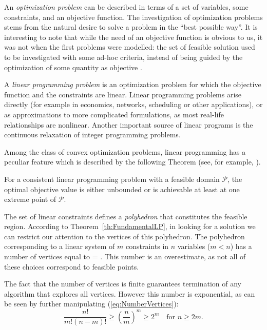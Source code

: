 An {\em optimization problem} can be described in terms of a set of variables, 
some constraints, and an objective function. 
The investigation of optimization problems stems from the natural
desire to solve a problem in the ``best possible way''.
It is interesting to note that while the need of an objective function 
is obvious to us, it was not when the first problems were modelled: the 
set of feasible solution used to be investigated with some ad-hoc criteria, 
instead of being guided by the optimization of some quantity as 
objective \cite{Dantzig02}.

A {\em linear programming problem} is an optimization problem for which
the objective function and the constraints are linear. 
Linear programming problems arise directly (for example in economics,
networks, scheduling or other applications), or as approximations to
more complicated formulations, as most real-life relationships are
nonlinear. Another important source of linear programs is the 
continuous relaxation of integer programming problems.

Among the class of convex optimization problems, linear programming
has a peculiar feature which is described by the following Theorem
(see, for example, \cite{FangPuthenpura93}).

\begin{theorem}
\label{th:FundamentalLP}
For a consistent linear programming problem with a
feasible domain $\mathcal{P}$, the optimal objective value is either
unbounded or is achievable at least at one extreme point of $\mathcal{P}$.
\end{theorem}

The set of linear constraints defines a {\em polyhedron} that constitutes
the feasible region.
According to Theorem~\ref{th:FundamentalLP}, in looking for a solution 
we can restrict our attention to the vertices of this polyhedron.
The polyhedron corresponding to a linear system of $m$ constraints 
in $n$ variables ($m < n$) has a number of vertices equal to
\be \label{eq:NumberVertices}
 = .
\ee
This number is an overestimate, as not all of these choices correspond
to feasible points.

The fact that the number of vertices is finite guarantees termination 
of any algorithm that explores all vertices.
However this number is exponential, as can be seen by further
manipulating (\ref{eq:NumberVertices}):
\[
\frac{n!}{m!(n-m)!} \ge \left( \frac{n}{m} \right)^m \ge 2^m 
\quad \mbox{for } n \ge 2m.
\]

